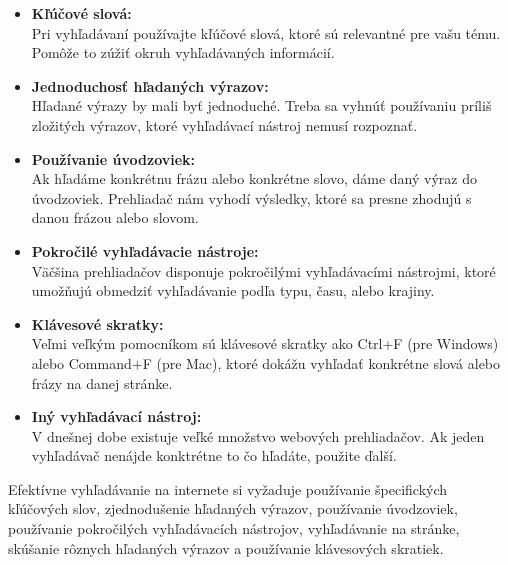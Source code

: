 \documentclass[10pt,twoside,slovak,a4paper]{article}
\begin{document}
\begin{itemize}
    \item \textbf{Kľúčové slová:\\}
    Pri vyhľadávaní používajte kľúčové slová, ktoré sú relevantné pre vašu tému. Pomôže to zúžiť okruh vyhľadávaných informácií.
    
    \item \textbf{Jednoduchosť hľadaných výrazov:\\}
    Hľadané výrazy by mali byť jednoduché. Treba sa vyhnúť používaniu príliš zložitých výrazov, ktoré vyhľadávací nástroj nemusí rozpoznať.

    \item \textbf{Používanie úvodzoviek:\\}
    Ak hľadáme konkrétnu frázu alebo konkrétne slovo, dáme daný výraz do úvodzoviek. Prehliadač nám vyhodí výsledky, ktoré sa presne zhodujú s danou frázou alebo slovom.

    \item \textbf{Pokročilé vyhľadávacie nástroje:\\}
    Väčšina prehliadačov disponuje pokročilými vyhľadávacími nástrojmi, ktoré umožňujú obmedziť vyhľadávanie podľa typu, času, alebo krajiny.
    
    \item \textbf{Klávesové skratky:\\}
    Veľmi veľkým pomocníkom sú klávesové skratky ako Ctrl+F (pre Windows) alebo Command+F (pre Mac), ktoré dokážu vyhľadať konkrétne slová alebo frázy na danej stránke.
    
    \item \textbf{Iný vyhľadávací nástroj:\\}
    V dnešnej dobe existuje veľké množstvo webových prehliadačov. Ak jeden vyhľadávač nenájde konktrétne to čo hľadáte, použite ďalší.
\end{itemize}

   Efektívne vyhľadávanie na internete si vyžaduje používanie špecifických kľúčových slov, zjednodušenie hľadaných výrazov, používanie úvodzoviek, používanie pokročilých vyhľadávacích nástrojov, vyhľadávanie na stránke, skúšanie rôznych hľadaných výrazov a používanie klávesových skratiek.
\end{document}
